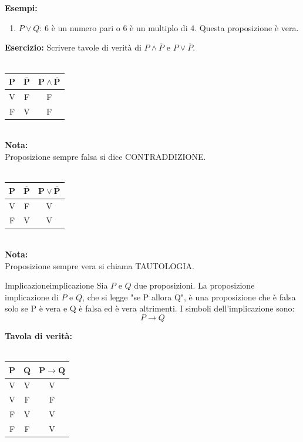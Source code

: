 \documentclass[12pt, letterpaper]{report}
\newcounter{definition}
\newcommand{\nmu}{}
\begin{document}
	\\
	\\
	\textbf{Esempi: }
	\begin{enumerate}
		\item $P \vee Q$: 6 è un numero pari o 6 è un multiplo di 4. Questa proposizione è vera.
	\end{enumerate}
	\textbf{Esercizio: } Scrivere tavole di verità di $P \wedge \overline P$ e $P \vee \overline P$.
	\\
	\\
	\begin{tabular}{c|c|c}
		$\mathbf{P}$ & $\mathbf{\overline P}$ & $\mathbf{P \wedge \overline P}$ \\
		\hline
		V & F & F\\
		F & V & F\\
 	\end{tabular}
	\\
	\textbf{Nota: }
	\\
	Proposizione sempre falsa si dice CONTRADDIZIONE.
	\\
	\\
	\begin{tabular}{c|c|c}
	$\mathbf{P}$ & $\mathbf{\overline P}$ & $\mathbf{P \vee \overline P}$ \\
	\hline
	V & F & V\\
	F & V & V\\
	\end{tabular}
	\\
	\textbf{Nota: }
	\\
	Proposizione sempre vera si chiama TAUTOLOGIA.
	\begin{definition}{\nmu Implicazione}{implicazione}
		Sia $P$ e $Q$ due proposizioni. La proposizione implicazione di $P$ e $Q$, che si legge "se P allora Q", è una proposizione che è falsa solo se P è vera e Q è falsa ed è vera altrimenti.
		I simboli dell'implicazione sono:
		\[
		P \to Q
		\]
	\end{definition}
	\textbf{Tavola di verità:}
	\\
	\\
	\begin{tabular}{c|c|c}
		$\mathbf{P}$ & $\mathbf{Q}$ & $\mathbf{P \to Q}$ \\
		\hline
		V & V & V \\
		V & F & F \\
		F & V & V \\
		F & F & V \\
	\end{tabular}
	\\
\end{document}
